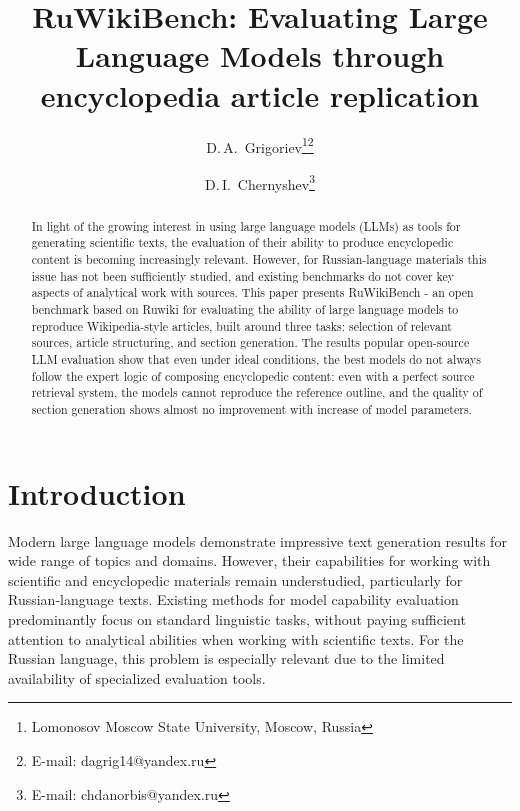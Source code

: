 \documentclass{superfri}
\begin{document}
\raggedbottom

\author{D.\,A.~Grigoriev\footnote{\label{msu}Lomonosov Moscow State University, Moscow, Russia}\footnote{E-mail: dagrig14@yandex.ru}
\and D.\,I.~Chernyshev\footnote{E-mail: chdanorbis@yandex.ru}}

\title{RuWikiBench: Evaluating Large Language Models through encyclopedia article replication}

\maketitle{}

\begin{abstract}
In light of the growing interest in using large language models (LLMs) as tools for generating scientific texts,
the evaluation of their ability to produce encyclopedic content is becoming increasingly relevant.
However, for Russian-language materials this issue has not been sufficiently studied, and existing benchmarks do not cover key aspects of analytical work with sources.
This paper presents RuWikiBench - an open benchmark based on Ruwiki for evaluating the ability of large language models to reproduce Wikipedia-style articles,
built around three tasks:
selection of relevant sources, article structuring, and section generation.
The results popular open-source LLM evaluation show that even under ideal conditions, the best models do not always follow the expert logic of composing encyclopedic content:
even with a perfect source retrieval system, the models cannot reproduce the reference outline, and the quality of section generation shows almost no improvement with increase of model parameters.

\end{abstract}

\section*{Introduction}
Modern large language models demonstrate impressive text generation results for wide range of topics and domains. 
However, their capabilities for working with scientific and encyclopedic materials remain understudied, particularly for Russian-language texts. 
Existing methods for model capability evaluation predominantly focus on standard linguistic tasks, without paying sufficient attention to analytical abilities when working with scientific texts. 
For the Russian language, this problem is especially relevant due to the limited availability of specialized evaluation tools.
\end{document}
